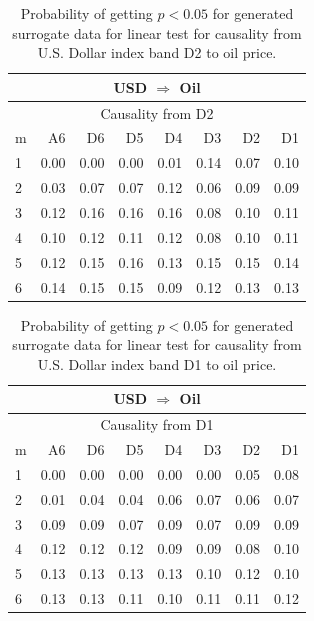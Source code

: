 %
%
\begin{table}[H]
\begin{center}
\begin{tabular}{l|r r r r r r r}
\hline\hline
\multicolumn{8}{c}{USD $\Rightarrow$ Oil}\\
\hline
\multicolumn{8}{c}{Causality from D2}\\
\hline\hline
m & A6 & D6 & D5 & D4 & D3 & D2 & D1 \\
\hline
1 & 0.00 & 0.00 & 0.00 & 0.01 & 0.14 & 0.07 & 0.10 \\
2 & 0.03 & 0.07 & 0.07 & 0.12 & 0.06 & 0.09 & 0.09 \\
3 & 0.12 & 0.16 & 0.16 & 0.16 & 0.08 & 0.10 & 0.11 \\
4 & 0.10 & 0.12 & 0.11 & 0.12 & 0.08 & 0.10 & 0.11 \\
5 & 0.12 & 0.15 & 0.16 & 0.13 & 0.15 & 0.15 & 0.14 \\
6 & 0.14 & 0.15 & 0.15 & 0.09 & 0.12 & 0.13 & 0.13 \\
\hline\hline
\end{tabular}
\caption{Probability of getting $p < 0.05$ for generated surrogate data for linear test for causality from U.S. Dollar index band D2 to oil price.}
\end{center}
\end{table}

%
%
\begin{table}[H]
\begin{center}
\begin{tabular}{l|r r r r r r r}
\hline\hline
\multicolumn{8}{c}{USD $\Rightarrow$ Oil}\\
\hline
\multicolumn{8}{c}{Causality from D1}\\
\hline\hline
m & A6 & D6 & D5 & D4 & D3 & D2 & D1 \\
\hline
1 & 0.00 & 0.00 & 0.00 & 0.00 & 0.00 & 0.05 & 0.08 \\
2 & 0.01 & 0.04 & 0.04 & 0.06 & 0.07 & 0.06 & 0.07 \\
3 & 0.09 & 0.09 & 0.07 & 0.09 & 0.07 & 0.09 & 0.09 \\
4 & 0.12 & 0.12 & 0.12 & 0.09 & 0.09 & 0.08 & 0.10 \\
5 & 0.13 & 0.13 & 0.13 & 0.13 & 0.10 & 0.12 & 0.10 \\
6 & 0.13 & 0.13 & 0.11 & 0.10 & 0.11 & 0.11 & 0.12 \\
\hline\hline
\end{tabular}
\caption{Probability of getting $p < 0.05$ for generated surrogate data for linear test for causality from U.S. Dollar index band D1 to oil price.}
\end{center}
\end{table}

